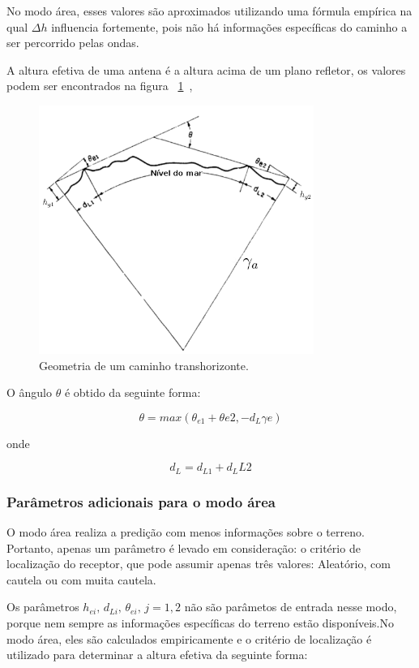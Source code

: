 No modo área, esses valores são aproximados utilizando uma fórmula empírica na qual $\Delta h$ influencia fortemente, pois não há informações específicas do caminho a ser percorrido pelas ondas.

A altura efetiva de uma antena é a altura acima de um plano refletor, os valores podem ser encontrados na figura ~\ref{fig:radiohorizon}~\cite{longleyrice}, 

\begin{figure}[radiohorizon]
\centering
\includegraphics[width=0.8\textwidth]{figs/radiohorizon}
\caption[Geometria de um caminho transhorizonte.]
{Geometria de um caminho transhorizonte.}
\label{fig:radiohorizon}
\end{figure}

O ângulo $\theta$ é obtido da seguinte forma:

\[
\theta = max(\theta_{e1} + \theta{e2}, -d_{L} \gamma e)
\]

onde

\[
d_L = d_{L1} + d_L{L2}
\]

\subsubsection{Parâmetros adicionais para o modo área}

O modo área realiza a predição com menos informações sobre o terreno. Portanto, apenas um parâmetro é levado em consideração: o critério de localização do receptor, que pode assumir apenas três valores: Aleatório, com cautela ou com muita cautela.

Os parâmetros \begin{math}h_{ei}, \, d_{Li}, \, \theta_{ei}, \, j=1,2\end{math} não são parâmetos de entrada nesse modo, porque nem sempre as informações específicas do terreno estão disponíveis.No modo área, eles são calculados empiricamente e o critério de localização é utilizado para determinar a altura efetiva da seguinte forma:

